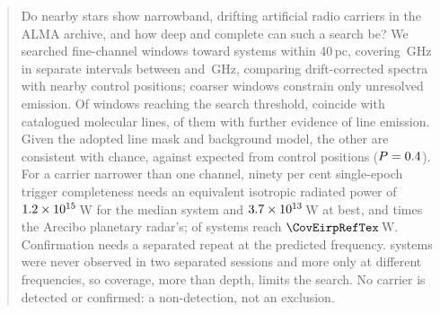\begin{abstract}
Do nearby stars show narrowband, drifting artificial radio carriers in the
ALMA archive, and how deep and complete can such a search be? We searched
\NWinA{} fine-channel windows toward \NSysClassA{} systems within 40\,pc,
covering \CvUnionA\,GHz in \CovNIslands{} separate intervals between
\SurvFreqLoA{} and \SurvFreqHiA\,GHz, comparing drift-corrected spectra
with nearby control positions; \NWinB{} coarser windows constrain
only unresolved emission. Of \CsNCross{} windows reaching the
search threshold, \MkNCoinc{} coincide with catalogued
molecular lines, \LnAttrSupp{} of them with further evidence of line emission.
Given the adopted line mask and background model, the other \CeObs{} are
consistent with chance, against \CeExp{} expected from control positions
($P=\CeProbNull$). For a carrier narrower than one channel, ninety per cent
single-epoch trigger completeness needs an equivalent isotropic radiated power of
$\EirpNinetySysMedA$\,W for the median system and $\EirpNinetySysLoA$\,W at
best, \AroMedMult{} and \AroDeepMult{} times the Arecibo
planetary radar's; \NSysEfifteen{} of \NSysALimSum{} systems reach
$\CovEirpRefTex$\,W. Confirmation needs a separated repeat at the
predicted frequency. \ZcNoRepNoSep{} systems were never observed in two
separated sessions and \ZcNoRepNoFreqWord{} more only at different frequencies, so
coverage, more than depth, limits the search. No carrier is detected or
confirmed: a non-detection, not an exclusion.
\end{abstract}


